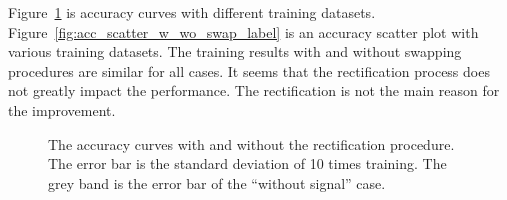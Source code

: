 \documentclass[12pt]{article}
\begin{document}
        Figure~\ref{fig:acc_curve_w_wo_swap_label} is accuracy curves with different training datasets. Figure~\ref{fig:acc_scatter_w_wo_swap_label} is an accuracy scatter plot with various training datasets. The training results with and without swapping procedures are similar for all cases. It seems that the rectification process does not greatly impact the performance. The rectification is not the main reason for the improvement.
        \begin{figure}[htpb]
            \centering
            \caption{The accuracy curves with and without the rectification procedure. The error bar is the standard deviation of 10 times training. The grey band is the error bar of the ``without signal'' case.}
            \label{fig:acc_curve_w_wo_swap_label}
        \end{figure}
\end{document}

